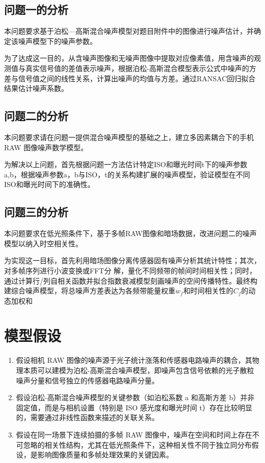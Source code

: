 \documentclass[a4paper]{article}
\begin{document}
	\subsection{问题一的分析}

    
    本问题要求基于泊松—高斯混合噪声模型对题目附件中的图像进行噪声估计，并确定该噪声模型下的噪声参数。
    \par
	为了达成这一目的，从含噪声图像和无噪声图像中提取对应像素值，用含噪声的观测值与真实信号值的差值表示噪声，根据泊松-高斯混合模型表示公式中噪声的方差与信号值之间的线性关系，计算出噪声的均值与方差。通过RANSAC回归拟合结果估计噪声系数。
	\subsection{问题二的分析}

	
    本问题要求请在问题一提供混合噪声模型的基础之上，建立多因素耦合下的手机 RAW 图像噪声数学模型。\par
    为解决以上问题，首先根据问题一方法估计特定ISO和曝光时间t下的噪声参数a,b，根据噪声参数a，b与ISO，t的关系构建扩展的噪声模型，验证模型在不同ISO和曝光时间下的准确性。
	\subsection{问题三的分析}

	本问题要求在低光照条件下，基于多帧RAW图像和暗场数据，改进问题二的噪声模型以纳入时空相关性。
	\par
	为实现这一目标，首先利用暗场图像分离传感器固有噪声分析其统计特性；其次，对多帧序列进行小波变换或FFT分
	解，量化不同频带的帧间时间相关性；同时，通过计算行/列自相关函数并拟合指数衰减模型刻画噪声的空间传播特性。最终构建综合噪声模型，将总噪声方差表达为各频带能量权重$w_f$和时间相关性的$C_f$的动态加权和
	
	\section{模型假设}
	\begin{enumerate}
		\item 假设相机 RAW 图像的噪声源于光子统计涨落和传感器电路噪声的耦合，其物理本质可以建模为泊松-高斯混合噪声模型，即噪声包含信号依赖的光子散粒噪声分量和信号独立的传感器电路噪声分量。
		\item 假设泊松-高斯混合噪声模型的关键参数（如泊松系数 a 和高斯方差 b）并非固定值，而是与相机设置（特别是 ISO 感光度和曝光时间 t）存在比较明显的，需要通过非线性函数来描述的关联关系。
		\item 假设在同一场景下连续拍摄的多帧 RAW 图像中，噪声在空间和时间上存在不可忽略的相关性结构，尤其在低光照条件下，这种相关性不同于独立同分布假设，是影响图像质量和多帧处理效果的关键因素。
	\end{enumerate}
\end{document}
